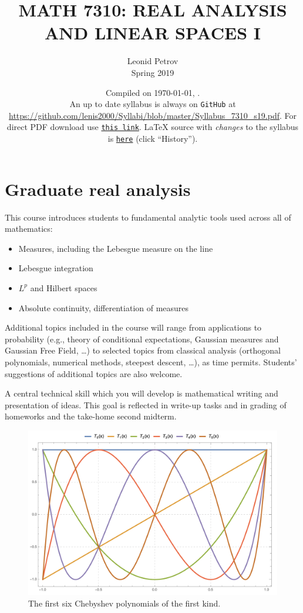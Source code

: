 \documentclass[oneside,11pt]{amsart}
\begin{document}
\title[MATH 7310: REAL ANALYSIS AND LINEAR SPACES I]{MATH 7310: REAL ANALYSIS AND LINEAR SPACES I}
\author{Leonid Petrov\\Spring 2019}
\date{Compiled on \today, \currenttime.\\An up to date syllabus is always on \texttt{GitHub} at \url{https://github.com/lenis2000/Syllabi/blob/master/Syllabus_7310_s19.pdf}. For direct PDF download use \href{https://github.com/lenis2000/Syllabi/raw/master/Syllabus_7310_s19.pdf}{\texttt{this link}}.
	\LaTeX{} source with \textit{changes} to the syllabus is \href{https://github.com/lenis2000/Syllabi/blob/master/Syllabus_7310_s19.tex}{\texttt{here}}
(click ``History'').}
\maketitle

\bigskip

\section{Graduate real analysis}
\bigskip

This course introduces students to fundamental analytic tools used across all of mathematics:
\begin{itemize}
	\item Measures, including the Lebesgue measure on the line
	\item Lebesgue integration
	\item $L^p$ and Hilbert spaces
	\item Absolute continuity, differentiation of measures
\end{itemize}

Additional topics included in the course will range from applications to 
probability (e.g., theory of conditional expectations, Gaussian measures and Gaussian Free Field, \ldots)
to selected topics from classical analysis (orthogonal polynomials, numerical methods, steepest descent, \ldots),
as time permits.
Students' suggestions of additional topics are also welcome.

A central technical skill which you will develop is mathematical writing
and presentation of ideas. This goal is reflected in write-up tasks and 
in grading of homeworks and the take-home second midterm.

\begin{figure}[h]
	\includegraphics[height=.32\textwidth]{img/chebyshev.png}
	\caption{The first six Chebyshev polynomials of the first kind.}
\end{figure}
\end{document}
